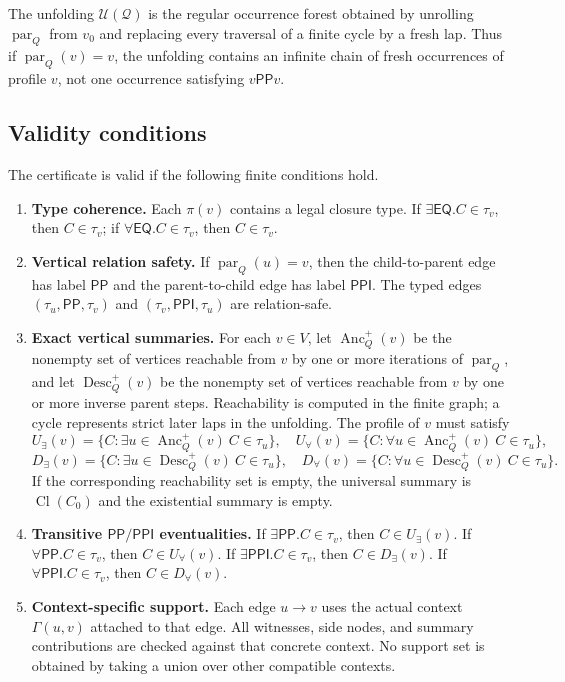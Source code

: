 \documentclass[11pt]{article}
\theoremstyle{remark}
\newcommand{\PP}{\mathsf{PP}}
\newcommand{\PPI}{\mathsf{PPI}}
\newcommand{\EQ}{\mathsf{EQ}}
\newcommand{\Cl}{\operatorname{Cl}}
\newcommand{\parr}{\operatorname{par}}
\newcommand{\Anc}{\operatorname{Anc}}
\newcommand{\Desc}{\operatorname{Desc}}
\newcommand{\Q}{\mathcal{Q}}
\newcommand{\U}{\mathcal{U}}
\begin{document}
The unfolding $\U(\Q)$ is the regular occurrence forest obtained by unrolling $\parr_Q$ from $v_0$ and replacing every traversal of a finite cycle by a fresh lap.  Thus if $\parr_Q(v)=v$, the unfolding contains an infinite chain of fresh occurrences of profile $v$, not one occurrence satisfying $v\PP v$.

\subsection{Validity conditions}
The certificate is valid if the following finite conditions hold.

\begin{enumerate}[label=(V\arabic*)]
\item \textbf{Type coherence.}  Each $\pi(v)$ contains a legal closure type.  If $\exists\EQ.C\in\tau_v$, then $C\in\tau_v$; if $\forall\EQ.C\in\tau_v$, then $C\in\tau_v$.

\item \textbf{Vertical relation safety.}  If $\parr_Q(u)=v$, then the child-to-parent edge has label $\PP$ and the parent-to-child edge has label $\PPI$.  The typed edges $(\tau_u,\PP,\tau_v)$ and $(\tau_v,\PPI,\tau_u)$ are relation-safe.

\item \textbf{Exact vertical summaries.}  For each $v\in V$, let $\Anc_Q^+(v)$ be the nonempty set of vertices reachable from $v$ by one or more iterations of $\parr_Q$, and let $\Desc_Q^+(v)$ be the nonempty set of vertices reachable from $v$ by one or more inverse parent steps.  Reachability is computed in the finite graph; a cycle represents strict later laps in the unfolding.  The profile of $v$ must satisfy
\[
U_\exists(v)=\{C:\exists u\in\Anc_Q^+(v)\ C\in\tau_u\},
\quad
U_\forall(v)=\{C:\forall u\in\Anc_Q^+(v)\ C\in\tau_u\},
\]
\[
D_\exists(v)=\{C:\exists u\in\Desc_Q^+(v)\ C\in\tau_u\},
\quad
D_\forall(v)=\{C:\forall u\in\Desc_Q^+(v)\ C\in\tau_u\}.
\]
If the corresponding reachability set is empty, the universal summary is $\Cl(C_0)$ and the existential summary is empty.

\item \textbf{Transitive $\PP/\PPI$ eventualities.}  If $\exists\PP.C\in\tau_v$, then $C\in U_\exists(v)$.  If $\forall\PP.C\in\tau_v$, then $C\in U_\forall(v)$.  If $\exists\PPI.C\in\tau_v$, then $C\in D_\exists(v)$.  If $\forall\PPI.C\in\tau_v$, then $C\in D_\forall(v)$.

\item \textbf{Context-specific support.}  Each edge $u\to v$ uses the actual context $\Gamma(u,v)$ attached to that edge.  All witnesses, side nodes, and summary contributions are checked against that concrete context.  No support set is obtained by taking a union over other compatible contexts.


\end{enumerate}
\end{document}
